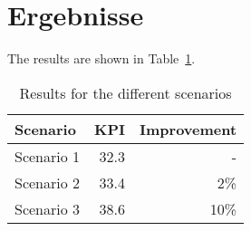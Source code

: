 \section{Ergebnisse}
The results are shown in Table~\ref{tab:results}. \lipsum[10]

\begin{table}[htb]
  \centering
  \begin{tabular}{lrr}
    \textbf{Scenario} & \textbf{KPI} & \textbf{Improvement}\\
    \hline
    Scenario 1 & 32.3 & -     \\
    Scenario 2 & 33.4 & 2\%   \\
    Scenario 3 & 38.6 & 10\%  \\
  \end{tabular}
  \caption{Results for the different scenarios}
  \label{tab:results}
\end{table}
